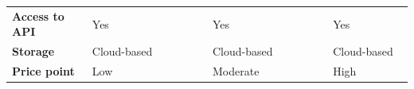 {{{\begin{table}[ht]
\begin{tabular}{p{0.2\linewidth} | p{0.3\linewidth} | p{0.3\linewidth} | p{0.3\linewidth}}
    \textbf{Access to API}  & Yes                                       & Yes                                                               & Yes                                                                                           \\
    \textbf{Storage}        & Cloud-based                               & Cloud-based                                                       & Cloud-based                                                                                   \\
    \textbf{Price point}    & Low                                       & Moderate                                                          & High                                                                                          \\
    \end{tabular}
\end{table}
{\renewcommand{\arraystretch}{1}%

}}}}
